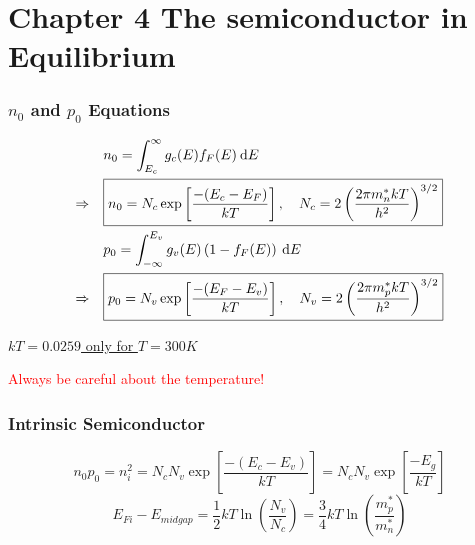 \documentclass{beamer}
\begin{document}
\section{Chapter 4 The semiconductor in Equilibrium}
    \begin{frame} \frametitle{$n_0$ and $p_0$ Equations}
        \begin{equation*}
            \begin{aligned}
                &n_0 = \int_{E_c}^\infty g_c(E) f_F(E) \: \mathrm{d} E \\
                \Rightarrow \quad &\boxed{n_0 = N_c \exp \left[ \frac{-(E_c - E_F)}{kT}  \right], \quad N_c = 2 \left( \frac{2\pi m_n^* kT}{h^2}  \right)^{3/2}} \\
                &p_0 = \int_{-\infty}^{E_v} g_v(E) \left(1 - f_F(E)\right) \: \mathrm{d} E \\
                \Rightarrow \quad &\boxed{p_0 = N_v \exp\left[ \frac{-(E_F - E_v)}{kT}  \right], \quad N_v = 2 \left( \frac{2\pi m_p^* kT}{h^2}  \right)^{3/2}}
            \end{aligned}
        \end{equation*}

        \begin{center}
            \underline{$kT = 0.0259$ only for $T = 300K$}
        \end{center}
        \begin{center}
            \textcolor{red}{Always be careful about the temperature!} 
        \end{center}
    \end{frame}

    \begin{frame} \frametitle{Intrinsic Semiconductor}
        \begin{equation*}
            \boxed{n_0 p_0 = n_i^2 = N_cN_v \exp \left[ \frac{-(E_c - E_v)}{kT}  \right] = N_c N_v \exp \left[ \frac{-E_g}{kT}  \right]}
        \end{equation*}
        \begin{equation*}
            \boxed{E_{Fi} - E_{midgap} = \frac{1}{2} kT \ln \left( \frac{N_v}{N_c}  \right) = \frac{3}{4} kT \ln \left( \frac{m_p^*}{m_n^*}  \right)}
        \end{equation*}
    \end{frame}
\end{document}
